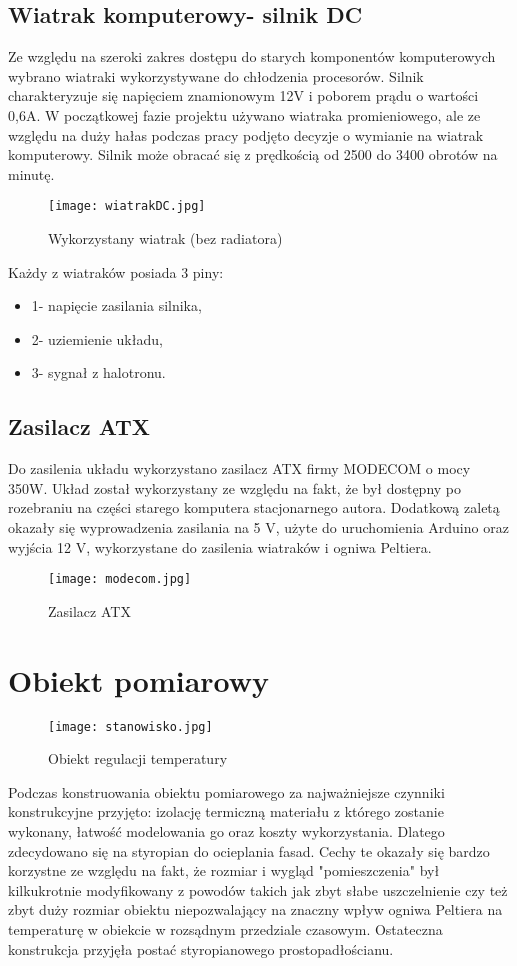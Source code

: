 \subsection{Wiatrak komputerowy- silnik DC}%
Ze względu na szeroki zakres dostępu do starych komponentów komputerowych wybrano wiatraki wykorzystywane do chłodzenia procesorów. Silnik charakteryzuje się napięciem znamionowym 12V i poborem prądu o wartości 0,6A. W początkowej fazie projektu używano wiatraka promieniowego, ale ze względu na duży hałas podczas pracy podjęto decyzje o wymianie na wiatrak komputerowy. Silnik może obracać się z prędkością od 2500 do 3400 obrotów na minutę.
\begin{figure}[H]
	\centering
	\texttt{[image: wiatrakDC.jpg]}
	\caption{Wykorzystany wiatrak (bez radiatora)}
\end{figure}
Każdy z wiatraków posiada 3 piny:
\begin{itemize}
\item 1- napięcie zasilania silnika,
\item 2- uziemienie układu,
\item 3- sygnał z halotronu.
\end{itemize}

\subsection{Zasilacz ATX}
Do zasilenia układu wykorzystano zasilacz ATX firmy MODECOM o mocy 350W. Układ został wykorzystany ze względu na fakt, że był dostępny po rozebraniu na części starego komputera stacjonarnego autora. Dodatkową zaletą okazały się wyprowadzenia zasilania na 5 V, użyte do uruchomienia Arduino oraz wyjścia 12 V, wykorzystane do zasilenia wiatraków i ogniwa Peltiera.
\begin{figure}[H]
	\centering
	\texttt{[image: modecom.jpg]}
	\caption{Zasilacz ATX}
\end{figure}
\section{Obiekt pomiarowy}%
\begin{figure}[H]
	\centering
	\texttt{[image: stanowisko.jpg]}
	\caption{Obiekt regulacji temperatury}
\end{figure}
Podczas konstruowania obiektu pomiarowego za najważniejsze czynniki konstrukcyjne przyjęto: izolację termiczną materiału z którego zostanie wykonany, łatwość modelowania go oraz koszty wykorzystania. Dlatego zdecydowano się na styropian do ocieplania fasad. Cechy te okazały się bardzo korzystne ze względu na fakt, że rozmiar i wygląd "pomieszczenia" był kilkukrotnie modyfikowany z powodów takich jak zbyt słabe uszczelnienie czy też zbyt duży rozmiar obiektu niepozwalający na znaczny wpływ ogniwa Peltiera na temperaturę w obiekcie w rozsądnym przedziale czasowym. Ostateczna konstrukcja przyjęła postać styropianowego prostopadłościanu.

